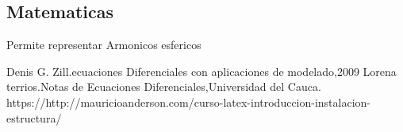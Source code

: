 \documentclass[12pt]{report}
\begin{document}
\subsection{Matematicas}
Permite representar Armonicos esfericos 
\begin{thebibliography}{0}
Denis G. Zill.ecuaciones Diferenciales con aplicaciones de modelado,2009
Lorena terrios.Notas de Ecuaciones Diferenciales,Universidad del Cauca.
https://http://mauricioanderson.com/curso-latex-introduccion-instalacion-estructura/
\end{thebibliography}
\end{document}
